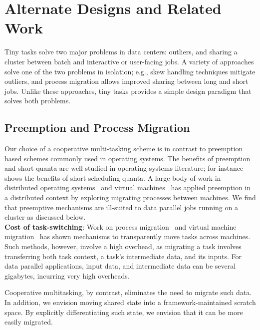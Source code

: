 \section{Alternate Designs and Related Work}

Tiny tasks solve two major problems in data centers: outliers, and sharing
a cluster between batch and interactive or user-facing jobs. A variety of
approaches solve one of the two problems in isolation; e.g., skew handling
techniques mitigate outliers, and process migration allows improved
sharing between long and short jobs.  Unlike these approaches, tiny tasks
provides a simple design paradigm that solves both problems.

\subsection{Preemption and Process Migration}
\label{sec:alternate}

Our choice of a cooperative multi-tasking scheme is in contrast to
preemption based schemes commonly used in operating systems. The benefits of
preemption and short quanta are well studied in operating
systems literature; for instance~\cite{sherman1972trace} shows the benefits
of short scheduling quanta. A large body of work in distributed
operating systems~\cite{douglis1991transparent,milojivcic2000process,rozier1991overview} and virtual machines~\cite{tanenbaum1990experiences}
has applied preemption in a distributed context by exploring migrating
processes between machines.
We find that preemptive mechanisms are
ill-suited to data parallel jobs running on a cluster as discussed below.\\
\textbf{Cost of task-switching}: Work on process
migration~\cite{douglis1991transparent,milojivcic2000process} and virtual
machine migration~\cite{clark2005live} has shown mechanisms to transparently
move tasks across machines. Such methods, however, involve a high overhead, as
migrating a task involves transferring both task context, a task's intermediate
data, and its inputs. For data parallel applications, input data, and intermediate
data can be several gigabytes, incurring very high overheads.

Cooperative multitasking, by contrast, eliminates the need to migrate such data. In
addition, we envision moving shared state into a framework-maintained scratch space.
By explicitly differentiating such state, we envision that it can be more easily migrated.

